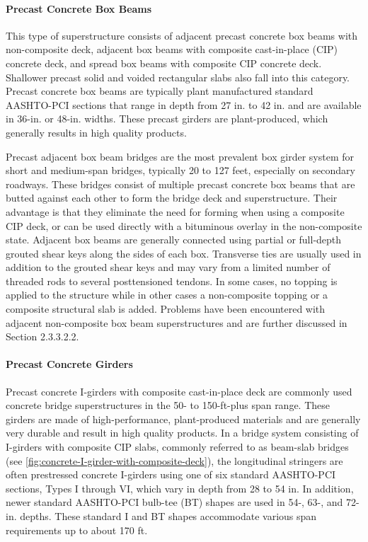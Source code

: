 \paragraph{Precast Concrete Box Beams}

This type of superstructure consists of adjacent precast concrete box beams with non-composite deck, adjacent box beams with composite cast-in-place (CIP) concrete deck, and spread box beams with composite CIP concrete deck. Shallower precast solid and voided rectangular slabs also fall into this category. Precast concrete box beams are typically plant manufactured standard AASHTO-PCI sections that range in depth from 27 in. to 42 in. and are available in 36-in. or 48-in. widths. These precast girders are plant-produced, which generally results in high quality products.

Precast adjacent box beam bridges are the most prevalent box girder system for short and medium-span bridges, typically 20 to 127 feet, especially on secondary roadways. These bridges consist of multiple precast concrete box beams that are butted against each other to form the bridge deck and superstructure. Their advantage is that they eliminate the need for forming when using a composite CIP deck, or can be used directly with a bituminous overlay in the non-composite state. Adjacent box beams are generally connected using partial or full-depth grouted shear keys along the sides of each box. Transverse ties are usually used in addition to the grouted shear keys and may vary from a limited number of threaded rods to several posttensioned tendons. In some cases, no topping is applied to the structure while in other cases a non-composite topping or a composite structural slab is added. Problems have been encountered with adjacent non-composite box beam superstructures and are further discussed in Section 2.3.3.2.2.

\paragraph{Precast Concrete Girders}

Precast concrete I-girders with composite cast-in-place deck are commonly used concrete bridge superstructures in the 50- to 150-ft-plus span range. These girders are made of high-performance, plant-produced materials and are generally very durable and result in high quality products. In a bridge system consisting of I-girders with composite CIP slabs, commonly referred to as beam-slab bridges (see \cref{fig:concrete-I-girder-with-composite-deck}), the longitudinal stringers are often prestressed concrete I-girders using one of six standard AASHTO-PCI sections, Types I through VI, which vary in depth from 28 to 54 in. In addition, newer standard AASHTO-PCI bulb-tee (BT) shapes are used in 54-, 63-, and 72- in. depths. These standard I and BT shapes accommodate various span requirements up to about 170 ft.

